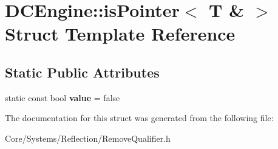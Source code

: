 \hypertarget{structDCEngine_1_1isPointer_3_01T_01_6_01_4}{\section{D\-C\-Engine\-:\-:is\-Pointer$<$ T \& $>$ Struct Template Reference}
\label{structDCEngine_1_1isPointer_3_01T_01_6_01_4}
}
\subsection*{Static Public Attributes}
\begin{DoxyCompactItemize}
\item 
\hypertarget{structDCEngine_1_1isPointer_3_01T_01_6_01_4_ad32186e98051080aa9a9da8f19c3ecdf}{static const bool {\bfseries value} = false}\label{structDCEngine_1_1isPointer_3_01T_01_6_01_4_ad32186e98051080aa9a9da8f19c3ecdf}

\end{DoxyCompactItemize}


The documentation for this struct was generated from the following file\-:\begin{DoxyCompactItemize}
\item 
Core/\-Systems/\-Reflection/Remove\-Qualifier.\-h\end{DoxyCompactItemize}
